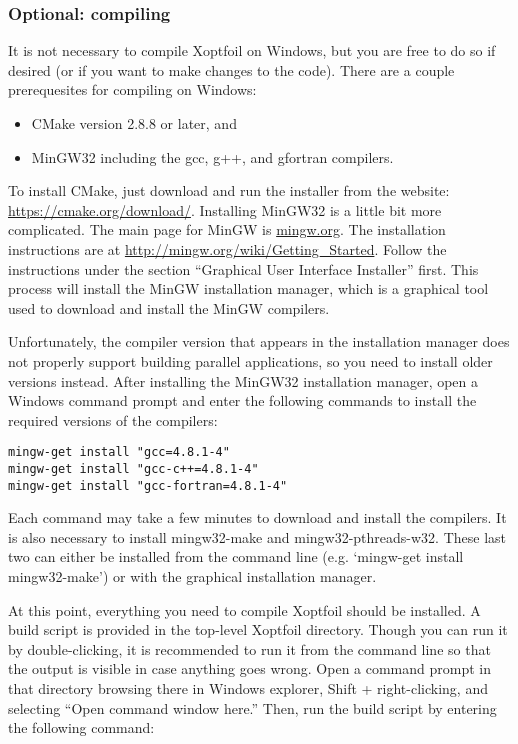 \documentclass[11pt]{article}
\begin{document}
\subsubsection{Optional: compiling}

It is not necessary to compile Xoptfoil on Windows, but you are free to do so if desired
(or if you want to make changes to the code). There are a couple prerequesites for
compiling on Windows:

\begin{itemize}
  \item{CMake version 2.8.8 or later, and}
  \item{MinGW32 including the gcc, g++, and gfortran compilers.}
\end{itemize}

To install CMake, just download and run the installer from the website:
\url{https://cmake.org/download/}. Installing MinGW32 is a little bit more complicated.
The main page for
MinGW is \url{mingw.org}. The installation instructions are at
\url{http://mingw.org/wiki/Getting_Started}. Follow the instructions under the section
``Graphical User Interface Installer'' first. This process will install the MinGW
installation manager, which is a graphical tool used to download and install the MinGW
compilers. 

Unfortunately, the compiler version that appears in the installation manager does not
properly support building parallel applications, so you need to install older versions
instead. After installing the MinGW32 installation manager, open a Windows command prompt
and enter the following commands to install the required versions of the compilers:

\begin{verbatim}
mingw-get install "gcc=4.8.1-4"
mingw-get install "gcc-c++=4.8.1-4"
mingw-get install "gcc-fortran=4.8.1-4"
\end{verbatim}

\noindent Each command may take a few minutes to download and install the compilers. 
It is also necessary to install mingw32-make and mingw32-pthreads-w32. These last two can
either be installed from the command line (e.g. `mingw-get install mingw32-make') or with
the graphical installation manager.

At this point, everything you need to compile Xoptfoil should be installed. A build script
is provided in the top-level Xoptfoil directory. Though you can run it by double-clicking,
it is recommended to run it from the command line so that the output is visible in case
anything goes wrong. Open a command prompt in that directory browsing there in Windows
explorer, Shift + right-clicking, and selecting ``Open command window here.''
Then, run the build script by entering the following command:
\end{document}
